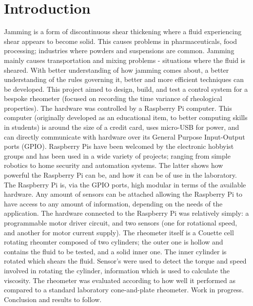 \documentclass[twoside,a4]{report}
\def\shorttitle{Development of a Rheometer Controller}
\def\br{\newline \newline \noindent}
\def\achapter{\shorttitle}  %
\def\nc#1{
	\addtocounter{chapter}{1} 
	\def\achapter{\arabic{chapter} #1}
	\chapter*{\arabic{chapter} #1} 
	\addcontentsline{toc}{chapter}{\achapter} 
}
\begin{document}
	\nc{Introduction} %
	Jamming is a form of discontinuous shear thickening where a fluid experiencing shear appears to become solid. This causes problems in pharmaceuticals, food processing; industries where powders and suspensions are common. Jamming mainly causes transportation and mixing problems - situations where the fluid is sheared. With better understanding of how jamming comes about, a better understanding of the rules governing it, better and more efficient techniques can be developed.\br
	This project aimed to design, build, and test a control system for a bespoke rheometer (focused on recording the time variance of rheological properties). \br
	The hardware was controlled by a Raspberry Pi computer. This computer (originally developed as an educational item, to better computing skills in students) is around the size of a credit card, uses micro-USB for power, and can directly communicate with hardware over its General Purpose Input-Output ports (GPIO).
	Raspberry Pis have been welcomed by the electronic hobbyist groups and has been used in a wide variety of projects; ranging from simple robotics to home security and automation systems. The latter shows how powerful the Raspberry Pi can be, and how it can be of use in the laboratory. The Raspberry Pi is, via the GPIO ports, high modular in terms of the available hardware. Any amount of sensors can be attached allowing the Raspberry Pi to have access to any amount of information, depending on the needs of the application. \br
	The hardware connected to the Raspberry Pi was relatively simply: a programmable motor driver circuit, and two sensors (one for rotational speed, and another for motor current supply).\br
	The rheometer itself is a Couette cell rotating rheomter composed of two cylinders; the outer one is hollow and contains the fluid to be tested, and a solid inner one. The inner cylinder is rotated which shears the fluid. Sensor's were used to detect the torque and speed involved in rotating the cylinder, information which is used to calculate the viscosity.\br
	The rheometer was evaluated according to how well it performed as compared to a standard laboratory cone-and-plate rheometer. \br
	Work in progress. Conclusion and results to follow.
\end{document}
